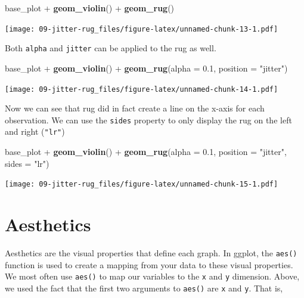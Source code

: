 \documentclass[]{book}
\newenvironment{Shaded}{\begin{snugshade}}{\end{snugshade}}
\newcommand{\KeywordTok}[1]{\textcolor[rgb]{0.13,0.29,0.53}{\textbf{{#1}}}}
\newcommand{\DataTypeTok}[1]{\textcolor[rgb]{0.13,0.29,0.53}{{#1}}}
\newcommand{\FloatTok}[1]{\textcolor[rgb]{0.00,0.00,0.81}{{#1}}}
\newcommand{\StringTok}[1]{\textcolor[rgb]{0.31,0.60,0.02}{{#1}}}
\newcommand{\NormalTok}[1]{{#1}}
\theoremstyle{definition}
\theoremstyle{definition}
\theoremstyle{remark}
\begin{document}
\begin{Shaded}
\begin{Highlighting}[]
\NormalTok{base_plot +}\StringTok{ }\KeywordTok{geom_violin}\NormalTok{() +}\StringTok{ }\KeywordTok{geom_rug}\NormalTok{()}
\end{Highlighting}
\end{Shaded}

\texttt{[image: 09-jitter-rug\_files/figure-latex/unnamed-chunk-13-1.pdf]}

Both \texttt{alpha} and \texttt{jitter} can be applied to the rug as
well.

\begin{Shaded}
\begin{Highlighting}[]
\NormalTok{base_plot +}\StringTok{ }\KeywordTok{geom_violin}\NormalTok{() +}\StringTok{ }\KeywordTok{geom_rug}\NormalTok{(}\DataTypeTok{alpha =} \FloatTok{0.1}\NormalTok{, }\DataTypeTok{position =} \StringTok{"jitter"}\NormalTok{)}
\end{Highlighting}
\end{Shaded}

\texttt{[image: 09-jitter-rug\_files/figure-latex/unnamed-chunk-14-1.pdf]}

Now we can see that rug did in fact create a line on the x-axis for each
observation. We can use the \texttt{sides} property to only display the
rug on the left and right (\texttt{"lr"})

\begin{Shaded}
\begin{Highlighting}[]
\NormalTok{base_plot +}\StringTok{ }\KeywordTok{geom_violin}\NormalTok{() +}\StringTok{ }\KeywordTok{geom_rug}\NormalTok{(}\DataTypeTok{alpha =} \FloatTok{0.1}\NormalTok{, }\DataTypeTok{position =} \StringTok{"jitter"}\NormalTok{, }\DataTypeTok{sides =} \StringTok{"lr"}\NormalTok{)}
\end{Highlighting}
\end{Shaded}

\texttt{[image: 09-jitter-rug\_files/figure-latex/unnamed-chunk-15-1.pdf]}

\section{Aesthetics}\label{aesthetics}

Aesthetics are the visual properties that define each graph. In ggplot,
the \texttt{aes()} function is used to create a mapping from your data
to these visual properties. We most often use \texttt{aes()} to map our
variables to the \texttt{x} and \texttt{y} dimension. Above, we used the
fact that the first two arguments to \texttt{aes()} are \texttt{x} and
\texttt{y}. That is,
\end{document}
